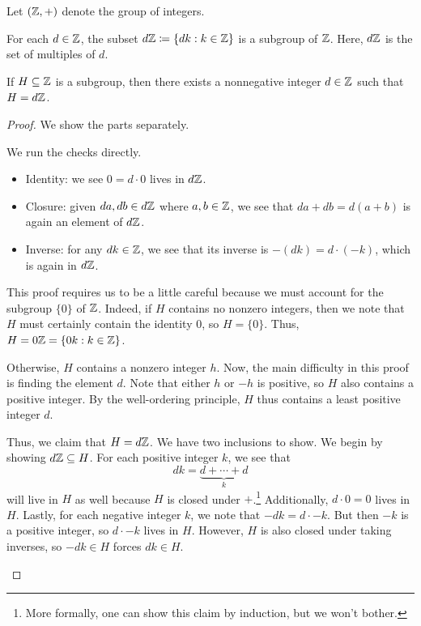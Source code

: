 \documentclass[../main.tex]{subfiles}
\begin{document}
\begin{proposition}
    Let $(\mathbb Z,+)$ denote the group of integers.
    \begin{listalph}
        \item For each $d\in\mathbb Z$, the subset $d\mathbb Z\coloneqq\{dk:k\in\mathbb Z\}$ is a subgroup of $\mathbb Z$. Here, $d\mathbb Z$ is the set of multiples of $d$.
        \item If $H\subseteq\mathbb Z$ is a subgroup, then there exists a nonnegative integer $d\in\mathbb Z$ such that $H=d\mathbb Z$.
    \end{listalph}
\end{proposition}
\begin{proof}
    We show the parts separately.
    \begin{listalph}
        \item We run the checks directly.
        \begin{itemize}
            \item Identity: we see $0=d\cdot 0$ lives in $d\mathbb Z$.
            \item Closure: given $da,db\in d\mathbb Z$ where $a,b\in\mathbb Z$, we see that $da+db=d(a+b)$ is again an element of $d\mathbb Z$.
            \item Inverse: for any $dk\in\mathbb Z$, we see that its inverse is $-(dk)=d\cdot(-k)$, which is again in $d\mathbb Z$.
        \end{itemize}
        
        \item This proof requires us to be a little careful because we must account for the subgroup $\{0\}$ of $\mathbb Z$. Indeed, if $H$ contains no nonzero integers, then we note that $H$ must certainly contain the identity $0$, so $H=\{0\}$. Thus, $H=0\mathbb Z=\{0k:k\in\mathbb Z\}$.
        
        Otherwise, $H$ contains a nonzero integer $h$. Now, the main difficulty in this proof is finding the element $d$. Note that either $h$ or $-h$ is positive, so $H$ also contains a positive integer. By the well-ordering principle, $H$ thus contains a least positive integer $d$.
        
        Thus, we claim that $H=d\mathbb Z$. We have two inclusions to show. We begin by showing $d\mathbb Z\subseteq H$. For each positive integer $k$, we see that
        \[dk=\underbrace{d+\cdots+d}_k\]
        will live in $H$ as well because $H$ is closed under $+$.\footnote{More formally, one can show this claim by induction, but we won't bother.} Additionally, $d\cdot0=0$ lives in $H$. Lastly, for each negative integer $k$, we note that $-dk=d\cdot -k$. But then $-k$ is a positive integer, so $d\cdot -k$ lives in $H$. However, $H$ is also closed under taking inverses, so $-dk\in H$ forces $dk\in H$.
        

\end{listalph}
\end{proof}
\end{document}
